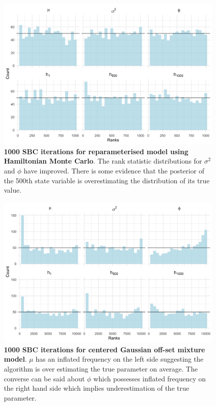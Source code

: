 \documentclass[12pt, a4paper]{article}
\begin{document}
        \begin{figure}[H]
        \centering
        \includegraphics[scale=0.09]{results/hmc_ncp_1k.png}
        \caption{\textbf{1000 SBC iterations for reparameterised model using Hamiltonian Monte Carlo}. The rank statistic distributions for $\sigma^2$ and $\phi$ have improved. There is some evidence that the posterior of the 500th state variable is overestimating the distribution of its true value.}
        \label{fig:ncphmc1k}
    \end{figure}

        \begin{figure}[H]
        \centering
        \includegraphics[scale=0.09]{results/ksc_cp_1k.png}
        \caption{\textbf{1000 SBC iterations for centered Gaussian off-set mixture model}. $\mu$ has an inflated frequency on the left side suggesting the algorithm is over estimating the true parameter on average. The converse can be said about $\phi$ which possesses inflated frequency on the right hand side which implies underestimation of the true parameter.}
        \label{fig:cpksc1k}
    \end{figure}
\end{document}
